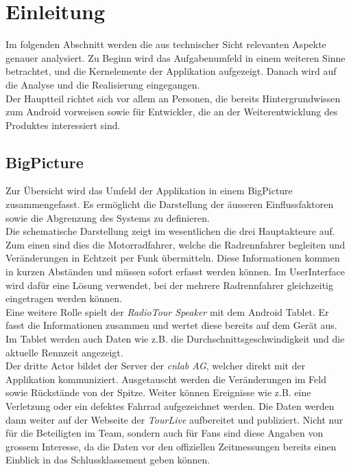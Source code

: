 \chapter{Einleitung}

Im folgenden Abschnitt werden die aus technischer Sicht relevanten Aspekte genauer analysiert. Zu Beginn wird das Aufgabenumfeld in einem weiteren Sinne betrachtet, und die Kernelemente der Applikation aufgezeigt. Danach wird auf die Analyse und die Realisierung eingegangen.
\\
Der Hauptteil richtet sich vor allem an Personen, die bereits Hintergrundwissen zum Android vorweisen sowie für Entwickler, die an der Weiterentwicklung des Produktes interessiert sind.

\section{BigPicture}
Zur Übersicht wird das Umfeld der Applikation in einem BigPicture zusammengefasst. Es ermöglicht die Darstellung der äusseren Einflussfaktoren sowie die Abgrenzung des Systems zu definieren.
\\
Die schematische Darstellung zeigt im wesentlichen die drei Hauptakteure auf. Zum einen sind dies die Motorradfahrer, welche die Radrennfahrer begleiten und Veränderungen in Echtzeit per Funk übermitteln. Diese Informationen kommen in kurzen Abständen und müssen sofort erfasst werden können. Im UserInterface wird dafür eine Lösung verwendet, bei der mehrere Radrennfahrer gleichzeitig eingetragen werden können.
\\
Eine weitere Rolle spielt der \textit{RadioTour Speaker} mit dem Android Tablet. Er fasst die Informationen zusammen und wertet diese bereits auf dem Gerät aus. Im Tablet werden auch Daten wie z.B. die Durchschnittsgeschwindigkeit und die aktuelle Rennzeit angezeigt.
\\
Der dritte Actor bildet der Server der \textit{cnlab AG}, welcher direkt mit der Applikation kommuniziert. Ausgetauscht werden die Veränderungen im Feld sowie Rückstände von der Spitze. Weiter können Ereignisse wie z.B. eine Verletzung oder ein defektes Fahrrad aufgezeichnet werden. Die Daten werden dann weiter auf der Webseite der \textit{TourLive} aufbereitet und publiziert. Nicht nur für die Beteiligten im Team, sondern auch für Fans sind diese Angaben von grossem Interesse, da die Daten vor den offiziellen Zeitmessungen bereits einen Einblick in das Schlussklassement geben können.

\newpage

